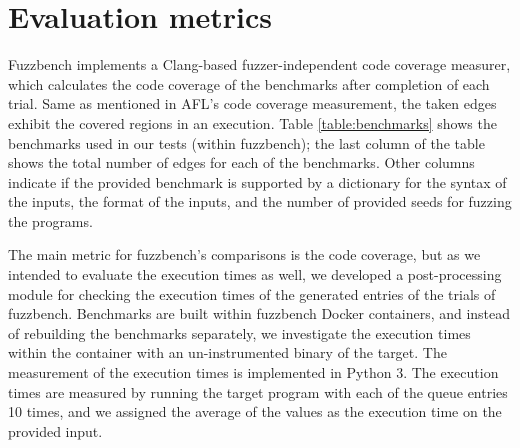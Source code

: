 \section{Evaluation metrics}
\label{sec:ch4-metrics}


Fuzzbench implements a Clang-based fuzzer-independent code coverage measurer, which calculates the code coverage of the benchmarks after completion of each trial. Same as mentioned in AFL's code coverage measurement, the taken edges exhibit the covered regions in an execution. Table \ref{table:benchmarks} shows the benchmarks used in our tests (within fuzzbench); the last column of the table shows the total number of edges for each of the benchmarks. Other columns indicate if the provided benchmark is supported by a dictionary for the syntax of the inputs, the format of the inputs, and the number of provided seeds for fuzzing the programs. 

\begin{table}[]
    \centering
    \caption{List of benchmarks used in evaluation}
    \label{table:benchmarks}
\end{table}


The main metric for fuzzbench's comparisons is the code coverage, but as we intended to evaluate the execution times as well, we developed a post-processing module for checking the execution times of the generated entries of the trials of fuzzbench. Benchmarks are built within fuzzbench Docker containers, and instead of rebuilding the benchmarks separately, we investigate the execution times within the container with an un-instrumented binary of the target. The measurement of the execution times is implemented in Python 3. The execution times are measured by running the target program with each of the queue entries 10 times, and we assigned the average of the values as the execution time on the provided input.
